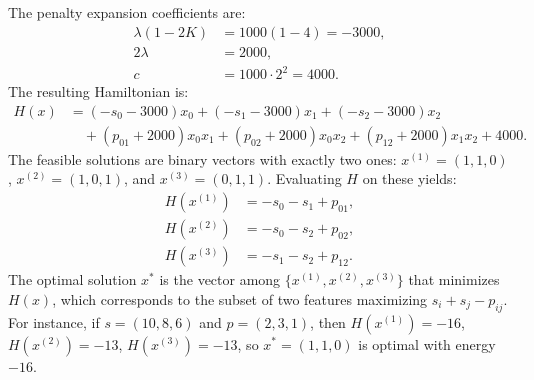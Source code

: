 \documentclass[12pt]{article}
\begin{document}
The penalty expansion coefficients are:
\begin{align}
    \lambda(1 - 2K) &= 1000(1 - 4) = -3000, \\
    2\lambda &= 2000, \\
    c &= 1000 \cdot 2^2 = 4000.
\end{align}
The resulting Hamiltonian is:
\begin{align}
    H(x) &= (-s_0 - 3000)x_0 + (-s_1 - 3000)x_1 + (-s_2 - 3000)x_2 \nonumber \\
    &\quad + (p_{01} + 2000)x_0 x_1 + (p_{02} + 2000)x_0 x_2 + (p_{12} + 2000)x_1 x_2 + 4000.
\end{align}
The feasible solutions are binary vectors with exactly two ones: $x^{(1)} = (1,1,0)$, $x^{(2)} = (1,0,1)$, and $x^{(3)} = (0,1,1)$. Evaluating $H$ on these yields:
\begin{align}
    H(x^{(1)}) &= -s_0 - s_1 + p_{01}, \\
    H(x^{(2)}) &= -s_0 - s_2 + p_{02}, \\
    H(x^{(3)}) &= -s_1 - s_2 + p_{12}.
\end{align}
The optimal solution $x^*$ is the vector among $\{x^{(1)}, x^{(2)}, x^{(3)}\}$ that minimizes $H(x)$, which corresponds to the subset of two features maximizing $s_i + s_j - p_{ij}$. For instance, if $s = (10, 8, 6)$ and $p = (2, 3, 1)$, then $H(x^{(1)}) = -16$, $H(x^{(2)}) = -13$, $H(x^{(3)}) = -13$, so $x^* = (1,1,0)$ is optimal with energy $-16$.
\end{document}
